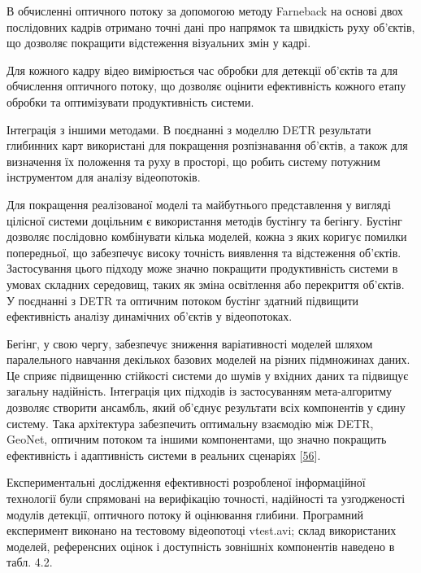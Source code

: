 \documentclass[
]{article}
\begin{document}
В обчисленні оптичного потоку за допомогою методу Farneback на основі двох послідовних кадрів отримано точні дані про напрямок та швидкість руху об'єктів, що дозволяє покращити відстеження візуальних змін у кадрі.

Для кожного кадру відео вимірюється час обробки для детекції об'єктів та для обчислення оптичного потоку, що дозволяє оцінити ефективність кожного етапу обробки та оптимізувати продуктивність системи.

Інтеграція з іншими методами. В поєднанні з моделлю DETR результати глибинних карт використані для покращення розпізнавання об'єктів, а також для визначення їх положення та руху в просторі, що робить систему потужним інструментом для аналізу відеопотоків.

Для покращення реалізованої моделі та майбутнього представлення у вигляді цілісної системи доцільним є використання методів бустінгу та бегінгу. Бустінг дозволяє послідовно комбінувати кілька моделей, кожна з яких коригує помилки попередньої, що забезпечує високу точність виявлення та відстеження об'єктів. Застосування цього підходу може значно покращити продуктивність системи в умовах складних середовищ, таких як зміна освітлення або перекриття об'єктів. У поєднанні з DETR та оптичним потоком бустінг здатний підвищити ефективність аналізу динамічних об'єктів у відеопотоках.

Бегінг, у свою чергу, забезпечує зниження варіативності моделей шляхом паралельного навчання декількох базових моделей на різних підмножинах даних. Це сприяє підвищенню стійкості системи до шумів у вхідних даних та підвищує загальну надійність. Інтеграція цих підходів із застосуванням мета-алгоритму дозволяє створити ансамбль, який об'єднує результати всіх компонентів у єдину систему. Така архітектура забезпечить оптимальну взаємодію між DETR, GeoNet, оптичним потоком та іншими компонентами, що значно покращить ефективність і адаптивність системи в реальних сценаріях {[}\hyperref[_Ref221384139]{56}{]}.

Експериментальні дослідження ефективності розробленої інформаційної технології були спрямовані на верифікацію точності, надійності та узгодженості модулів детекції, оптичного потоку й оцінювання глибини. Програмний експеримент виконано на тестовому відеопотоці vtest.avi; склад використаних моделей, референсних оцінок і доступність зовнішніх компонентів наведено в табл. 4.2.
\end{document}
